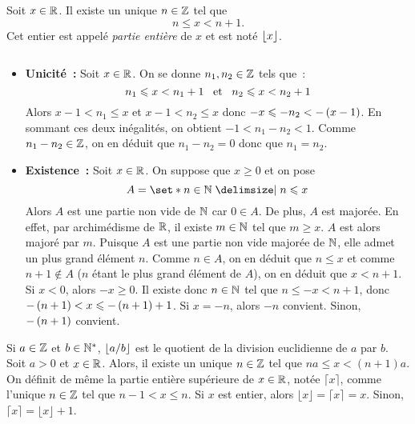 \documentclass{magnolia}
\begin{document}


\begin{definition}[utile=-3]
Soit $x\in\mathbb{R}$. Il existe un unique $n\in\mathbb{Z}$ tel que
\[n\leq x<n+1.\]
Cet entier est appelé \emph{partie entière} de $x$ et est noté $\left\lfloor x\right\rfloor$.
\end{definition}

\begin{preuve}
$\quad$
\begin{itemize}
\item \textbf{Unicité~:}
  Soit $x\in\mathbb{R}$. On se donne $n_1,n_2\in\mathbb{Z}$ tels que~:
  \[n_1\leqslant x<n_1+1 \quad\!\text{et}\quad\! n_2\leqslant x<n_2+1\]
  Alors $x-1<n_1\leq x$ et $x-1<n_2\leq x$ donc $-x\leqslant -n_2<-\left(x-1\right)$. En
  sommant ces deux inégalités, on obtient $-1<n_1-n_2<1$. Comme $n_1-n_2\in\mathbb{Z}$,
  on en déduit que $n_1-n_2=0$ donc que $n_1=n_2$.
\item \textbf{Existence~:}
  Soit $x\in\mathbb{R}$. On suppose que $x\geq 0$ et on pose
  \[A=\enstq{n\in\N}{n\leq x}\]
  Alors $A$ est une partie non vide de $\mathbb{N}$ car $0\in A$. De plus, $A$ est
  majorée.
  En effet, par archimédisme de $\mathbb{R}$, il existe $m\in\mathbb{N}$ tel que $m\geq x$. $A$
  est alors majoré par $m$. Puisque $A$ est une partie non vide majorée de $\mathbb{N}$,
  elle admet un plus grand élément $n$. Comme $n\in A$, on en déduit que
  $n\leq x$ et comme $n+1\not\in A$ ($n$ étant le plus grand élément de $A$), on
  en déduit que $x<n+1$.\\
  Si $x<0$, alors $-x\geq 0$. Il existe donc $n\in\mathbb{N}$ tel que
  $n\leq -x<n+1$, donc $-\left(n+1\right)<x\leqslant -\left(n+1\right)+1$. Si $x=-n$, alors $-n$
  convient. Sinon, $-\left(n+1\right)$ convient.
\end{itemize}
\end{preuve}

\begin{remarques}
  \remarque Si $a\in\mathbb{Z}$ et $b\in{\mathbb{N}^*}$, $\left\lfloor a/b\right\rfloor$ est le quotient de la division euclidienne de $a$ par $b$.
  \remarque Soit $a>0$ et $x\in\mathbb{R}$. Alors, il existe un unique $n\in\mathbb{Z}$
    tel que $na\leq x < (n+1)a$.
  \remarque  On définit de même la partie entière supérieure de $x\in\mathbb{R}$,
    notée $\lceil x\rceil$, comme l'unique $n\in\mathbb{Z}$ tel que $n-1<x\leq n$. Si $x$
    est entier, alors $\lfloor x\rfloor=\lceil x\rceil=x$. Sinon,
    $\lceil x\rceil=\lfloor x\rfloor+1$.
\end{remarques}
\end{document}
